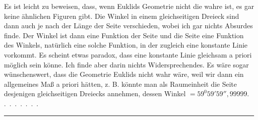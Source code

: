 Es ist leicht zu beweisen, dass, wenn Euklids Geometrie nicht die wahre ist,
es gar keine ähnlichen Figuren gibt. Die Winkel in einem gleichseitigen Dreieck
sind dann auch je nach der Länge der Seite verschieden, wobei ich gar nichts
Absurdes finde. Der Winkel ist dann eine Funktion der Seite und die Seite eine Funktion
des Winkels, natürlich eine solche Funktion, in der zugleich eine
konstante Linie vorkommt. Es scheint etwas paradox, dass eine konstante Linie
  gleichsam a priori möglich sein könne. Ich finde aber darin nichts
Widersprechendes. Es wäre sogar wünschenswert, dass die Geometrie Euklids nicht
  wahr wäre, weil wir dann ein allgemeines Maß a priori hätten, z. B.
könnte man als Raumeinheit die Seite desjenigen gleichseitigen Dreiecks annehmen,
  dessen Winkel $=59^{0} 59' 59''{,}99999$. .\ .\ .\ .\ .\ .\ .

\begin{center}\rule{3cm}{0.4pt}\end{center}
